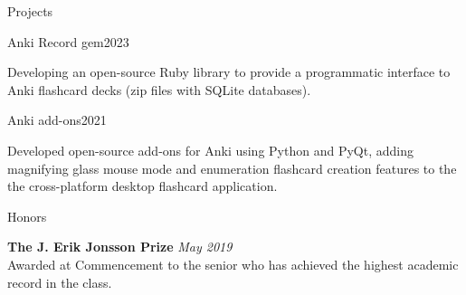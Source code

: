 \documentclass{resume}
\begin{document}
  \begin{rSection}{Projects}
    \begin{rSubsection}{Anki Record gem}{2023}{}{}
        \item Developing an open-source Ruby library to provide a programmatic interface to Anki flashcard decks (zip files with SQLite databases).
    \end{rSubsection}
        
    \begin{rSubsection}{Anki add-ons}{2021}{}{}
        \item Developed open-source add-ons for Anki using Python and PyQt, adding magnifying glass mouse mode and enumeration flashcard creation features to the the cross-platform desktop flashcard application.
    \end{rSubsection}  
  \end{rSection}

  \begin{rSection}{Honors}
  
    {\bf The J. Erik Jonsson Prize} \hfill {\em May 2019} \\
    Awarded at Commencement to the senior who has achieved the highest academic record in the class.
    
  \end{rSection}
\end{document}
